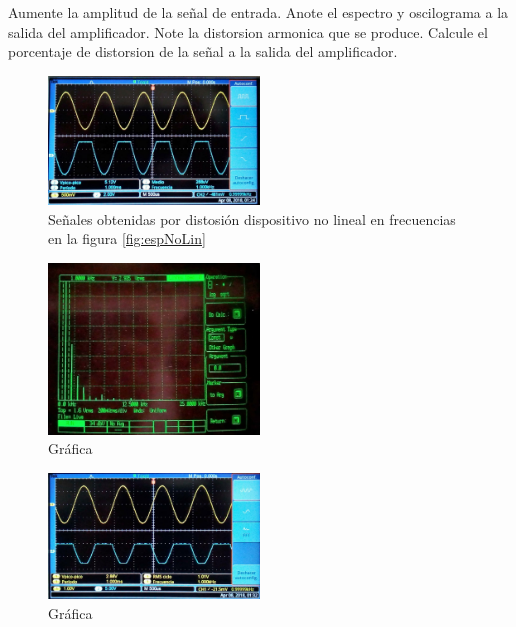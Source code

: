 \documentclass{article}
\begin{document}
Aumente la amplitud de la señal de entrada. Anote el espectro y oscilograma a la salida del amplificador. Note la distorsion armonica que se produce. Calcule el porcentaje de distorsion de la señal a la salida del amplificador. 

\begin{figure}[h!]
    \centering
    \includegraphics[width=0.5\textwidth]{Imagenes/SistComDistAlin1.jpg}
    \caption{Señales obtenidas por distosión dispositivo no lineal en frecuencias en la figura \ref{fig:espNoLin}}
    \label{fig:SenialEspNoLin}
\end{figure}

\begin{figure}[h!]
    \centering
    \includegraphics[width=0.5\textwidth]{Imagenes/SistComDistAlin2.jpg}
    \caption{Gráfica}
    \label{fig:grafB}
\end{figure}

\begin{figure}[h!]
    \centering
    \includegraphics[width=0.5\textwidth]{Imagenes/SistComDistAlin3.jpg}
    \caption{Gráfica}
    \label{fig:grafC}
\end{figure}
\end{document}

